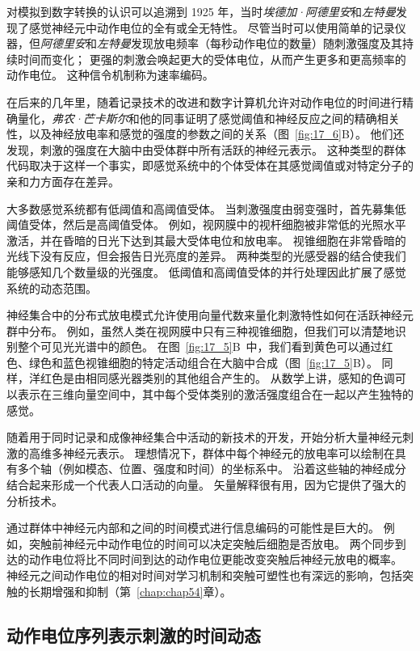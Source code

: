 对模拟到数字转换的认识可以追溯到 1925 年，当时\textit{埃德加·阿德里安}和\textit{左特曼}发现了感觉神经元中动作电位的全有或全无特性。 
尽管当时可以使用简单的记录仪器，但\textit{阿德里安}和\textit{左特曼}发现放电频率（每秒动作电位的数量）随刺激强度及其持续时间而变化； 
更强的刺激会唤起更大的受体电位，从而产生更多和更高频率的动作电位。 
这种信令机制称为速率编码。


在后来的几年里，随着记录技术的改进和数字计算机允许对动作电位的时间进行精确量化，\textit{弗农·芒卡斯尔}和他的同事证明了感觉阈值和神经反应之间的精确相关性，以及神经放电率和感觉的强度的参数之间的关系（图~\ref{fig:17_6}B）。
他们还发现，刺激的强度在大脑中由受体群中所有活跃的神经元表示。
这种类型的群体代码取决于这样一个事实，即感觉系统中的个体受体在其感觉阈值或对特定分子的亲和力方面存在差异。


大多数感觉系统都有低阈值和高阈值受体。 
当刺激强度由弱变强时，首先募集低阈值受体，然后是高阈值受体。 
例如，视网膜中的视杆细胞被非常低的光照水平激活，并在昏暗的日光下达到其最大受体电位和放电率。 
视锥细胞在非常昏暗的光线下没有反应，但会报告日光亮度的差异。 
两种类型的光感受器的结合使我们能够感知几个数量级的光强度。 
低阈值和高阈值受体的并行处理因此扩展了感觉系统的动态范围。


神经集合中的分布式放电模式允许使用向量代数来量化刺激特性如何在活跃神经元群中分布。 
例如，虽然人类在视网膜中只有三种视锥细胞，但我们可以清楚地识别整个可见光光谱中的颜色。 
在图~\ref{fig:17_5}B~中，我们看到黄色可以通过红色、绿色和蓝色视锥细胞的特定活动组合在大脑中合成（图~\ref{fig:17_5}B）。 
同样，洋红色是由相同感光器类别的其他组合产生的。 
从数学上讲，感知的色调可以表示在三维向量空间中，其中每个受体类别的激活强度组合在一起以产生独特的感觉。


随着用于同时记录和成像神经集合中活动的新技术的开发，开始分析大量神经元刺激的高维多神经元表示。
理想情况下，群体中每个神经元的放电率可以绘制在具有多个轴（例如模态、位置、强度和时间）的坐标系中。
沿着这些轴的神经成分结合起来形成一个代表人口活动的向量。
矢量解释很有用，因为它提供了强大的分析技术。


通过群体中神经元内部和之间的时间模式进行信息编码的可能性是巨大的。
例如，突触前神经元中动作电位的时间可以决定突触后细胞是否放电。
两个同步到达的动作电位将比不同时间到达的动作电位更能改变突触后神经元放电的概率。
神经元之间动作电位的相对时间对学习机制和突触可塑性也有深远的影响，包括突触的长期增强和抑制（第~\ref{chap:chap54}章）。



\subsection{动作电位序列表示刺激的时间动态}

